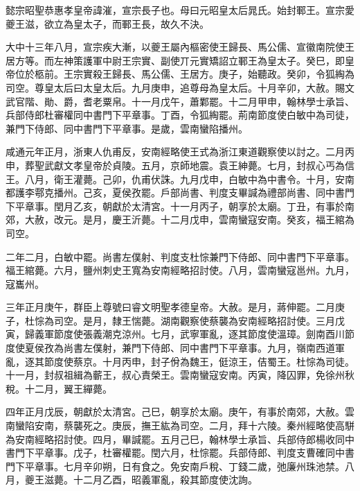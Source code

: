
\begin{pinyinscope}

 懿宗昭聖恭惠孝皇帝諱漼，宣宗長子也。母曰元昭皇太后晁氏。始封鄆王。宣宗愛夔王滋，欲立為皇太子，而鄆王長，故久不決。



 大中十三年八月，宣宗疾大漸，以夔王屬內樞密使王歸長、馬公儒、宣徽南院使王居方等。而左神策護軍中尉王宗實、副使丌元實矯詔立鄆王為皇太子。癸巳，即皇帝位於柩前。王宗實殺王歸長、馬公儒、王居方。庚子，始聽政。癸卯，令狐綯為司空。尊皇太后曰太皇太后。九月庚申，追尊母為皇太后。十月辛卯，大赦。賜文武官階、勛、爵，耆老粟帛。十一月戊午，蕭鄴罷。十二月甲申，翰林學士承旨、兵部侍郎杜審權同中書門下平章事。丁酉，令狐綯罷。荊南節度使白敏中為司徒，兼門下侍郎、同中書門下平章事。是歲，雲南蠻陷播州。



 咸通元年正月，浙東人仇甫反，安南經略使王式為浙江東道觀察使以討之。二月丙申，葬聖武獻文孝皇帝於貞陵。五月，京師地震。袁王紳薨。七月，封叔心丐為信王。八月，衛王灌薨。己卯，仇甫伏誅。九月戊申，白敏中為中書令。十月，安南都護李鄠克播州。己亥，夏侯孜罷。戶部尚書、判度支畢諴為禮部尚書、同中書門下平章事。閏月乙亥，朝獻於太清宮。十一月丙子，朝享於太廟。丁丑，有事於南郊，大赦，改元。是月，慶王沂薨。十二月戊申，雲南蠻寇安南。癸亥，福王綰為司空。



 二年二月，白敏中罷。尚書左僕射、判度支杜悰兼門下侍郎、同中書門下平章事。福王綰薨。六月，鹽州刺史王寬為安南經略招討使。八月，雲南蠻寇邕州。九月，寇巂州。



 三年正月庚午，群臣上尊號曰睿文明聖孝德皇帝。大赦。是月，蔣伸罷。二月庚子，杜悰為司空。是月，隸王惴薨。湖南觀察使蔡襲為安南經略招討使。三月戊寅，歸義軍節度使張義潮克涼州。七月，武寧軍亂，逐其節度使溫璋。劍南酉川節度使夏侯孜為尚書左僕射，兼門下侍郎、同中書門下平章事。九月，嶺南西道軍亂，逐其節度使蔡京。十月丙申，封子佾為魏王，侹涼王，佶蜀王。杜悰為司徒。十一月，封叔祖緝為蘄王，叔心責榮王。雲南蠻寇安南。丙寅，降囚罪，免徐州秋稅。十二月，翼王繟薨。



 四年正月戊辰，朝獻於太清宮。己巳，朝享於太廟。庚午，有事於南郊，大赦。雲南蠻陷安南，蔡襲死之。庚辰，撫王紘為司空。二月，拜十六陵。秦州經略使高駢為安南經略招討使。四月，畢諴罷。五月己巳，翰林學士承旨、兵部侍郎楊收同中書門下平章事。戊子，杜審權罷。閏六月，杜悰罷。兵部侍郎、判度支曹確同中書門下平章事。七月辛卯朔，日有食之。免安南戶稅、丁錢二歲，弛廉州珠池禁。八月，夔王滋薨。十二月乙酉，昭義軍亂，殺其節度使沈詢。




\end{pinyinscope}
